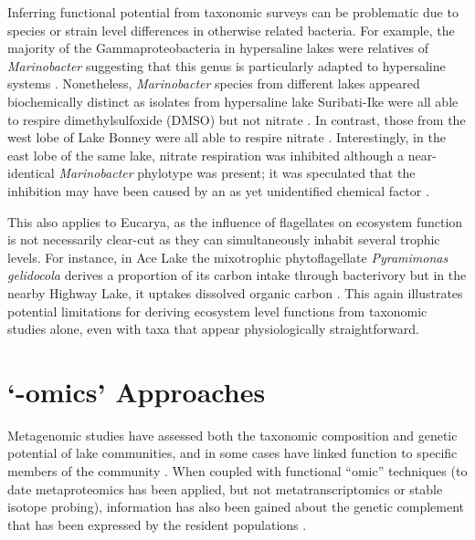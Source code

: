 Inferring functional potential from taxonomic surveys can be problematic due to species or strain level differences in otherwise related bacteria.
For example, the majority of the Gammaproteobacteria in hypersaline lakes were relatives of \textit{Marinobacter} suggesting that this genus is particularly adapted to hypersaline systems
\cite{Bowman2000b, Glatz2006, Matsuzaki2006, Mosier2007}.
Nonetheless, \textit{Marinobacter} species from different lakes appeared biochemically distinct
 as isolates from hypersaline lake Suribati-Ike were all able to respire dimethylsulfoxide (DMSO) but not nitrate \cite{Matsuzaki2006}. 
In contrast, those from the west lobe of Lake Bonney were all able to respire nitrate \cite{Ward1997}. 
Interestingly, in the east lobe of the same lake, nitrate respiration was inhibited although a near-identical \textit{Marinobacter} phylotype was present; 
it was speculated that the inhibition may have been caused by an as yet unidentified chemical factor \cite{Ward2005, Glatz2006}. 

This also applies to Eucarya, as the influence of flagellates on ecosystem function is not necessarily clear-cut as they can simultaneously inhabit several trophic levels. 
For instance, in Ace Lake the mixotrophic phytoflagellate \textit{Pyramimonas gelidocola} derives a proportion of its carbon intake through bacterivory \cite{Bell2003} 
but in the nearby Highway Lake, it uptakes dissolved organic carbon \cite{Laybourn-Parry2005}. 
This again illustrates potential limitations for deriving ecosystem level functions from taxonomic studies alone, even with taxa that appear physiologically straightforward. 


\section{`-omics' Approaches}
Metagenomic studies have assessed both the taxonomic composition and genetic potential of lake communities, and in some cases have linked function to specific members of the community 
\cite{Lopez-Bueno2009, Ng2010, Lauro2011, Yau2011, Varin2012}.%
When coupled with functional ``omic'' techniques (to date metaproteomics has been applied, but not metatranscriptomics or stable isotope probing), 
information has also been gained about the genetic complement that has been expressed by the resident populations \cite{Ng2010 Lauro2011, Yau2011}.
